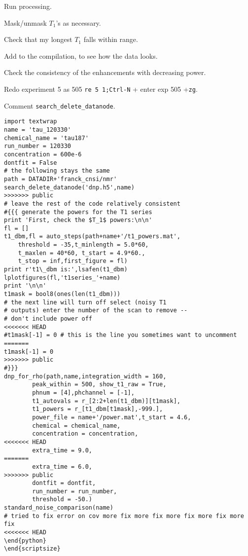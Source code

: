 \begin{scriptsize}
\begin{python}[off]
\begin{scriptsize}
\begin{python}[off]
Run processing.

Mask/unmask $T_1$'s as necessary.

Check that my longest $T_1$ falls within range.

Add to the compilation, to see how the data looks.

Check the consistency of the enhancements with decreasing power.

Redo experiment 5 as 505 \texttt{re 5 1;Ctrl-N} + enter exp 505 +\texttt{zg}.

Comment {\tt search\_delete\_datanode}.


\begin{scriptsize}
\begin{lstlisting}
import textwrap
name = 'tau_120330'
chemical_name = 'tau187'
run_number = 120330
concentration = 600e-6
dontfit = False
# the following stays the same
path = DATADIR+'franck_cnsi/nmr'
search_delete_datanode('dnp.h5',name)
>>>>>>> public
# leave the rest of the code relatively consistent
#{{{ generate the powers for the T1 series
print 'First, check the $T_1$ powers:\n\n'
fl = []
t1_dbm,fl = auto_steps(path+name+'/t1_powers.mat',
    threshold = -35,t_minlength = 5.0*60,
    t_maxlen = 40*60, t_start = 4.9*60.,
    t_stop = inf,first_figure = fl)
print r't1\_dbm is:',lsafen(t1_dbm)
lplotfigures(fl,'t1series_'+name)
print '\n\n'
t1mask = bool8(ones(len(t1_dbm)))
# the next line will turn off select (noisy T1
# outputs) enter the number of the scan to remove --
# don't include power off
<<<<<<< HEAD
#t1mask[-1] = 0 # this is the line you sometimes want to uncomment
=======
t1mask[-1] = 0
>>>>>>> public
#}}}
dnp_for_rho(path,name,integration_width = 160,
        peak_within = 500, show_t1_raw = True,
        phnum = [4],phchannel = [-1],
        t1_autovals = r_[2:2+len(t1_dbm)][t1mask],
        t1_powers = r_[t1_dbm[t1mask],-999.],
        power_file = name+'/power.mat',t_start = 4.6,
        chemical = chemical_name,
        concentration = concentration,
<<<<<<< HEAD
        extra_time = 9.0,
=======
        extra_time = 6.0,
>>>>>>> public
        dontfit = dontfit,
        run_number = run_number,
        threshold = -50.)
standard_noise_comparison(name)
# tried to fix error on cov more fix more fix more fix more fix more fix
<<<<<<< HEAD
\end{python}
\end{scriptsize}


\end{lstlisting}
\end{scriptsize}
\end{python}
\end{scriptsize}
\end{python}
\end{scriptsize}
